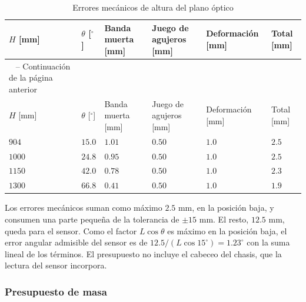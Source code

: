 \documentclass[../../General.tex]{subfiles}
\begin{document}
\begin{center}
    \footnotesize
    \begin{xltabular}{\textwidth}{|>{\centering\arraybackslash}X|>{\centering\arraybackslash}X|>{\centering\arraybackslash}X|>{\centering\arraybackslash}X|>{\centering\arraybackslash}X|>{\centering\arraybackslash}X|}
        \caption{Errores mecánicos de altura del plano óptico\label{tab:error_altura_elev}} \\
        \hline
        $H$ [mm] & $\theta$ [$^\circ$] & Banda muerta [mm] & Juego de agujeros [mm] & Deformación [mm] & Total [mm] \\ \hline
        \endfirsthead

        {\tablename\ \thetable{} -- Continuación de la página anterior} \\
        \hline
        $H$ [mm] & $\theta$ [$^\circ$] & Banda muerta [mm] & Juego de agujeros [mm] & Deformación [mm] & Total [mm] \\ \hline
        \endhead

        \hline
        \endfoot

        \hline
        \endlastfoot

        $904$ & $15.0$ & $1.01$ & $0.50$ & $1.0$ & $2.5$ \\ \hline
        $1000$ & $24.8$ & $0.95$ & $0.50$ & $1.0$ & $2.5$ \\ \hline
        $1150$ & $42.0$ & $0.78$ & $0.50$ & $1.0$ & $2.3$ \\ \hline
        $1300$ & $66.8$ & $0.41$ & $0.50$ & $1.0$ & $1.9$ \\ \hline
    \end{xltabular}
\end{center}

Los errores mecánicos suman como máximo $2.5\text{ mm}$, en la posición baja, y consumen una parte pequeña de la tolerancia de $\pm 15\text{ mm}$. El resto, $12.5\text{ mm}$, queda para el sensor. Como el factor $L\cos\theta$ es máximo en la posición baja, el error angular admisible del sensor es de $12.5/(L\cos 15^\circ) = 1.23^\circ$ con la suma lineal de los términos. El presupuesto no incluye el cabeceo del chasis, que la lectura del sensor incorpora.

\subsubsection{Presupuesto de masa}
\end{document}
